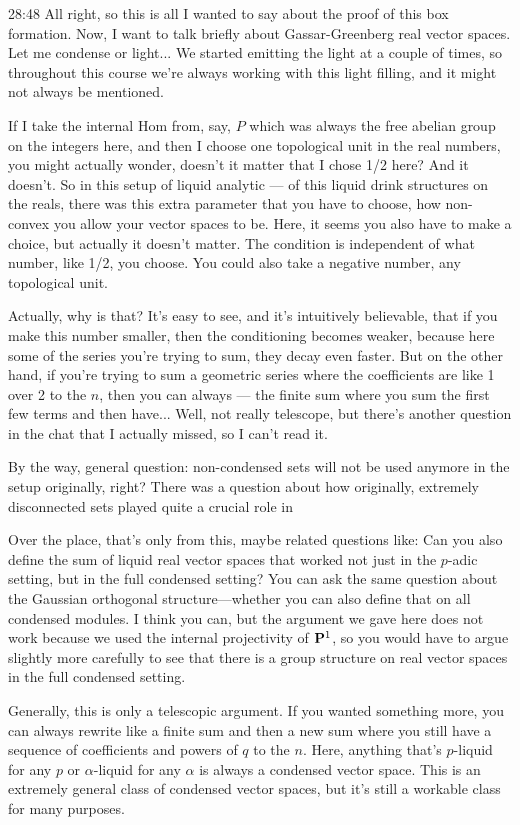 \begin{unfinished}{28:48}
All right, so this is all I wanted to say about the proof of this box formation. Now, I want to talk briefly about Gassar-Greenberg real vector spaces. Let me condense or light... We started emitting the light at a couple of times, so throughout this course we're always working with this light filling, and it might not always be mentioned.

If I take the internal Hom from, say, $P$ which was always the free abelian group on the integers here, and then I choose one topological unit in the real numbers, you might actually wonder, doesn't it matter that I chose 1/2 here? And it doesn't. So in this setup of liquid analytic --- of this liquid drink structures on the reals, there was this extra parameter that you have to choose, how non-convex you allow your vector spaces to be. Here, it seems you also have to make a choice, but actually it doesn't matter. The condition is independent of what number, like 1/2, you choose. You could also take a negative number, any topological unit.

Actually, why is that? It's easy to see, and it's intuitively believable, that if you make this number smaller, then the conditioning becomes weaker, because here some of the series you're trying to sum, they decay even faster. But on the other hand, if you're trying to sum a geometric series where the coefficients are like 1 over 2 to the $n$, then you can always --- the finite sum where you sum the first few terms and then have... Well, not really telescope, but there's another question in the chat that I actually missed, so I can't read it.

By the way, general question: non-condensed sets will not be used anymore in the setup originally, right? There was a question about how originally, extremely disconnected sets played quite a crucial role in

Over the place, that's only from this, maybe related questions like: Can you also define the sum of liquid real vector spaces that worked not just in the $p$-adic setting, but in the full condensed setting? You can ask the same question about the Gaussian orthogonal structure---whether you can also define that on all condensed modules. I think you can, but the argument we gave here does not work because we used the internal projectivity of $\P^1$, so you would have to argue slightly more carefully to see that there is a group structure on real vector spaces in the full condensed setting.

Generally, this is only a telescopic argument. If you wanted something more, you can always rewrite like a finite sum and then a new sum where you still have a sequence of coefficients and powers of $q$ to the $n$. Here, anything that's $p$-liquid for any $p$ or $\alpha$-liquid for any $\alpha$ is always a condensed vector space. This is an extremely general class of condensed vector spaces, but it's still a workable class for many purposes.


\end{unfinished}
